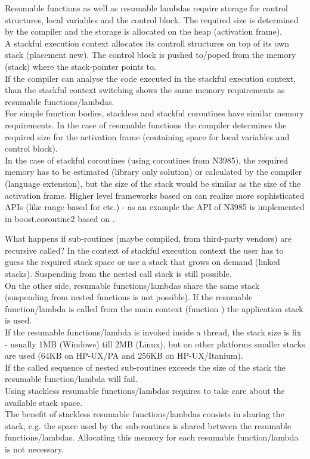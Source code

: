Resumable functions as well as resumable lambdas require storage for control
structures, local variables and the control block. The required size is
determined by the compiler and the storage is allocated on the heap (activation
frame).\\
A stackful execution context allocates its controll structures on top of its own
stack (placement new). The control block is pushed to/poped from the memory
(stack) where the stack-pointer points to.\\
If the compiler can analyse the code executed in the stackful execution context,
than the stackful context switching shows the same memory requirements as
resumable functions/lambdas.\\
\newline
For simple function bodies, stackless and stackful coroutines have similar
memory requirements.
In the case of resumable functions the compiler determines the required size for
the activation frame (containing space for local variables and control block).\\
In the case of stackful coroutines (using coroutines from N3985), the required
memory has to be estimated (library only solution) or calculated by the compiler
(language extension), but the size of the stack would be similar as the size
of the activation frame.
Higher level frameworks based on \ectx can realize more sophisticated APIs
(like range based for etc.) - as an example the API of N3985\cite{N3985} is
implemented in boost.coroutine2\cite{bcoroutine2} based on
.

What happens if sub-routines (maybe compiled, from third-party vendors) are
recursive called? In the context of stackful execution context
the user has to guess the required stack space or use a stack that grows on
demand (linked stacks). Suspending from the nested call stack is still
possible.\\
\newline
On the other side, resumable functions/lambdas share the same stack (suspending
from nested functions is not possible). If the resumable function/lambda is
called from the main context (function \main) the application stack is used.\\
If the resumable functions/lambda is invoked inside a thread, the stack size is
fix - usually 1MB (Windows) till 2MB (Linux), but on other platforms smaller
stacks are used (64KB on HP-UX/PA and 256KB on HP-UX/Itanium).\\
If the called sequence of nested sub-routines exceeds the size of the stack the
resumable function/lambda will fail.\\
\newline
Using stackless resumable functions/lambdas requires to take care about the
available stack space.\\
\newline
The benefit of stackless resumable functions/lambdas consists in sharing the
stack, e.g. the space used by the sub-routines is shared between the resumable
functions/lambdas. Allocating this memory for each resumable function/lambda is
not necessary.

